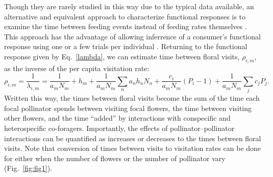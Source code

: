 \begin{refsection}
Though they are rarely studied in this way due to the typical data available, an alternative and equivalent approach to characterize functional responses is to examine the time between feeding events instead of feeding rates themselves \citep{coblentz2020estimating}. This approach has the advantage of allowing inferrence of a consumer's functional response using one or a few trials per individual \citep{coblentz2020estimating}. Returning to the functional response given by Eq.~\ref{lambda}, we can estimate time between floral visits, $\rho_{i,m}$, as the inverse of the per capita visitation rate:
  \begin{equation}
    \label{rho}
	\rho_{i,m} =
	\frac{1}{\lambda_{i,m}} =
	\frac{1}{a_{m}N_{m}} +
	 h_{m} +
	 \frac{1}{a_{m}N_{m}}\sum_{n}a_{n}h_{n}N_{n}+
	 \frac{c_{i}}{a_{m}N_{m}} (P_{i}-1)+
	 \frac{1}{a_{m}N_{m}} \sum_{j} c_{j}P_{j}  \text{.}
  \end{equation}
Written this way, the times between floral visits become the sum of the time each focal pollinator spends between visiting focal flowers, the time between visiting other flowers, and the time ``added'' by interactions with conspecific and heterospecific co-foragers. Importantly, the effects of pollinator--pollinator interactions can be quantified as increases or decreases to the times between floral visits. Note that conversion of times between visits to visitation rates can be done for either when the number of flowers or the number of pollinator vary (Fig.~\ref{fig:fig1}).



\end{refsection}
